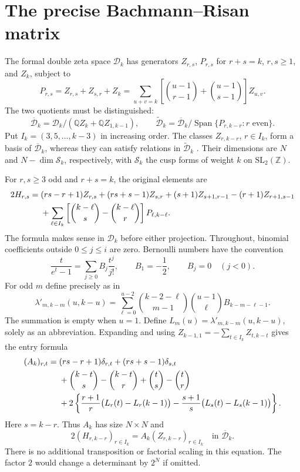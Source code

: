 \documentclass[12pt]{amsart}
\theoremstyle{definition}
\theoremstyle{remark}
\numberwithin{equation}{section}
\newcommand{\Z}{\mathbb{Z}}
\newcommand{\Q}{\mathbb{Q}}
\newcommand{\Span}{\operatorname{Span}}
\newcommand{\Dbar}{\overline{\mathcal D}_k}
\newcommand{\Dtilde}{\widetilde{\mathcal D}_k}
\theoremstyle{definition}
\theoremstyle{remark}
\begin{document}
\section{The precise Bachmann--Risan matrix}
The formal double zeta space $\mathcal D_k$ has generators $Z_{r,s}$,
$P_{r,s}$ for $r+s=k$, $r,s\geq1$, and $Z_k$, subject to
\begin{equation}\label{en:ds}
 P_{r,s}=Z_{r,s}+Z_{s,r}+Z_k
 =\sum_{u+v=k}\left[\binom{u-1}{r-1}+\binom{u-1}{s-1}\right]Z_{u,v}.
\end{equation}
The two quotients must be distinguished:
\[
 \Dbar=\mathcal D_k/(\Q Z_k+\Q Z_{1,k-1}),\qquad
 \Dtilde=\Dbar/\Span\{P_{r,k-r}:r\text{ even}\}.
\]
Put $I_k=(3,5,\ldots,k-3)$ in increasing order.
The classes $Z_{r,k-r}$, $r\in I_k$, form a basis of $\Dbar$,
whereas they can satisfy relations in $\Dtilde$
\cite[Lemma 5.14 and Proposition 5.3]{BR}. Their dimensions are
$N$ and $N-\dim\mathcal S_k$, respectively, with
$\mathcal S_k$ the cusp forms of weight $k$ on $\mathrm{SL}_2(\Z)$.

For $r,s\geq3$ odd and $r+s=k$, the original elements are
\begin{align}\label{en:H}
2H_{r,s}={}&(rs-r+1)Z_{r,s}+(rs+s-1)Z_{s,r}
 +(s+1)Z_{s+1,r-1}-(r+1)Z_{r+1,s-1}\notag\\
 &+\sum_{\ell\in I_k}
 \left[\binom{k-\ell}{s}-\binom{k-\ell}{r}\right]P_{\ell,k-\ell}.
\end{align}
The formula makes sense in $\mathcal D_k$ before either projection.
Throughout, binomial coefficients outside $0\leq j\leq i$ are zero.
Bernoulli numbers have the convention
\[
 \frac{t}{e^t-1}=\sum_{j\geq0}B_j\frac{t^j}{j!},\qquad
 B_1=-\frac12,\qquad B_j=0\quad(j<0).
\]
For odd $m$ define precisely as in \cite[(5.28)]{BR}
\begin{equation}\label{en:lambda}
 \lambda'_{m,k-m}(u,k-u)=
 \sum_{\ell=0}^{u-2}\binom{k-2-\ell}{m-1}
                 \binom{u-1}{\ell}B_{k-m-\ell-1}.
\end{equation}
The summation is empty when $u=1$. Define
$L_m(u)=\lambda'_{m,k-m}(u,k-u)$, solely as an abbreviation.
Expanding \cite[(5.30)]{BR} and using
$Z_{k-1,1}=-\sum_{t\in I_k}Z_{t,k-t}$ gives the entry formula
\begin{align}\label{en:Aentry}
 (A_k)_{r,t}={}&(rs-r+1)\delta_{r,t}+(rs+s-1)\delta_{s,t}\notag\\
 &+\binom{k-t}{s}-\binom{k-t}{r}
       +\binom{t}{s}-\binom{t}{r}\notag\\
 &+2\left\{\frac{r+1}{r}\bigl(L_r(t)-L_r(k-1)\bigr)
       -\frac{s+1}{s}\bigl(L_s(t)-L_s(k-1)\bigr)\right\}.
\end{align}
Here $s=k-r$. Thus $A_k$ has size $N\times N$ and
\begin{equation}\label{en:AZ}
 2(H_{r,k-r})_{r\in I_k}=A_k(Z_{r,k-r})_{r\in I_k}
 \quad\text{in }\Dbar.
\end{equation}
There is no additional transposition or factorial scaling in this equation.
The factor $2$ would change a determinant by $2^N$ if omitted.
\end{document}
